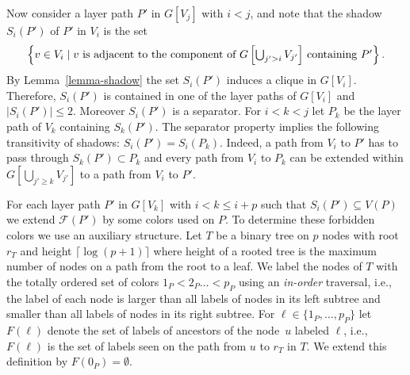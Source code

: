 Now consider a layer path $P'$ in $G[V_j]$ with $i<j$, and note that
the
shadow $S_i(P')$ of $P'$ in $V_i$ is the set
\[
\left\{v\in V_i\mid \hbox{$v$ is adjacent to the component of $G\left[\bigcup_{j'>i} V_{j'}\right]$ containing $P'$}\right\}.
\]
By Lemma~\ref{lemma-shadow} the set $S_i(P')$
induces a clique in $G[V_i]$.
Therefore, $S_i(P')$ is contained in one of the layer paths of
$G[V_i]$ and $|S_i(P')|\leq 2$. Moreover $S_i(P')$ is a separator.
For $i<k<j$ let $P_k$ be the layer path of $V_k$ containing
$S_k(P')$. The separator property implies the following
transitivity of shadows:
$S_i(P') = S_i(P_k)$. Indeed, a path from $V_i$ to $P'$
has to pass through $S_k(P')\subset P_k$ and every path from
$V_i$ to $P_k$ can be extended within $G[\bigcup_{j'\geq k} V_{j'}]$
to a path from $V_i$ to $P'$.

For each layer path $P'$ in $G[V_k]$ with $i<k\leq i+p$ such that
$S_i(P') \subseteq V(P)$ we extend $\mathcal{F}(P')$ by some colors used on
$P$.  To determine these forbidden colors we use an auxiliary
structure.  Let $T$ be a binary tree on $p$ nodes with root $r_T$ and
height $\lceil \log(p+1)\rceil$ where height of a rooted tree is the
maximum number of nodes on a path from the root to a leaf.  We label
the nodes of $T$ with the totally ordered set of colors $1_P < 2_P\ldots <p_P$
using an \emph{in-order} traversal, i.e., the label of each node is
larger than all labels of nodes in its left subtree and smaller than
all labels of nodes in its right subtree. For
$\ell\in\{1_P,\ldots,p_P\}$ let~$F(\ell)$ denote the set of labels
of ancestors of the node~$u$ labeled $\ell$, i.e., $F(\ell)$ is the
set of labels seen on the path from $u$ to $r_T$ in $T$. We extend
this definition by $F(0_P)=\emptyset$.

